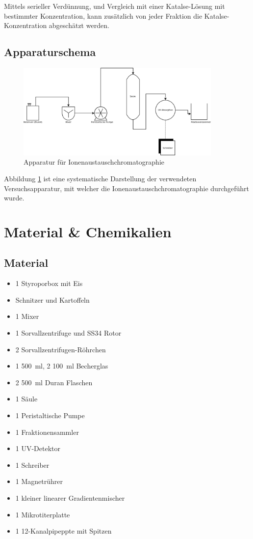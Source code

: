 \documentclass[a4paper,german]{scrreprt}
\begin{document}
Mittels serieller Verdünnung, und Vergleich mit einer Katalse-Lösung mit
bestimmter Konzentration, kann zusätzlich von jeder Fraktion die
Katalse-Konzentration abgeschätzt werden.


\section{Apparaturschema}

\begin{figure}[h]
	\centering
	\includegraphics[width=0.9\textwidth]{img/apparatur.png}
	\caption{Apparatur für Ionenaustauschchromatographie}
	\label{fig:apparatur}
\end{figure}

Abbildung \ref{fig:apparatur} ist eine systematische Darstellung der
verwendeten Versuchsapparatur, mit welcher die Ionenaustauschchromatographie
durchgeführt wurde.

\chapter{Material \& Chemikalien}

\section{Material}

\begin{itemize}
	\item 1 Styroporbox mit Eis
	\item Schnitzer und Kartoffeln
	\item 1 Mixer
	\item 1 Sorvallzentrifuge und SS34 Rotor
	\item 2 Sorvallzentrifugen-Röhrchen
	\item 1 \SI{500}{ml}, 2 \SI{100}{ml} Becherglas
	\item 2 \SI{500}{ml} Duran Flaschen
	\item 1 Säule
	\item 1 Peristaltische Pumpe
	\item 1 Fraktionensammler
	\item 1 UV-Detektor
	\item 1 Schreiber
	\item 1 Magnetrührer
	\item 1 kleiner linearer Gradientenmischer
	\item 1 Mikrotiterplatte
	\item 1 12-Kanalpipeppte mit Spitzen
\end{itemize}
\end{document}
